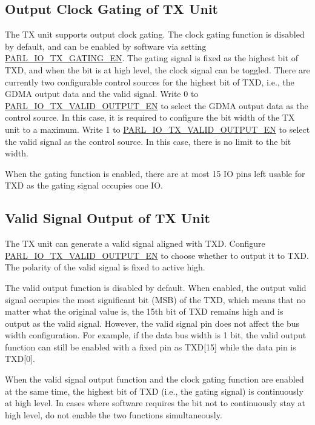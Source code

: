 \documentclass[main\_\_EN.tex]{subfiles}
\begin{document}
{
\subsection{Output Clock Gating of TX Unit}

The TX unit supports output clock gating. The clock gating function is disabled by default, and can be enabled by software via setting \hyperref[fielddesc:PARLIOTXGATINGEN]{PARL\_IO\_TX\_GATING\_EN}. The gating signal is fixed as the highest bit of TXD, and when the bit is at high level, the clock signal can be toggled. There are currently two configurable control sources for the highest bit of TXD, i.e., the GDMA output data and the valid signal. Write 0 to \hyperref[fielddesc:PARLIOTXVALIDOUTPUTEN]{PARL\_IO\_TX\_VALID\_OUTPUT\_EN} to select the GDMA output data as the control source. In this case, it is required to configure the bit width of the TX unit to a maximum. Write 1 to \hyperref[fielddesc:PARLIOTXVALIDOUTPUTEN]{PARL\_IO\_TX\_VALID\_OUTPUT\_EN} to select the valid signal as the control source. In this case, there is no limit to the bit width.

When the gating function is enabled, there are at most 15 IO pins left usable for TXD as the gating signal occupies one IO.

\subsection{Valid Signal Output of TX Unit }

The TX unit can generate a valid signal aligned with TXD. Configure \hyperref[fielddesc:PARLIOTXVALIDOUTPUTEN]{PARL\_IO\_TX\_VALID\_OUTPUT\_EN} to choose whether to output it to TXD. The polarity of the valid signal is fixed to active high.

The valid output function is disabled by default. When enabled, the output valid signal occupies the most significant bit (MSB) of the TXD, which means that no matter what the original value is, the 15th bit of TXD remains high and is output as the valid signal. However, the valid signal pin does not affect the bus width configuration. For example, if the data bus width is 1 bit, the valid output function can still be enabled with a fixed pin as TXD[15] while the data pin is TXD[0].


\begin{tiplisting}
When the valid signal output function and the clock gating function are enabled at the same time, the highest bit of TXD (i.e., the gating signal) is continuously at high level. In cases where software requires the bit not to continuously stay at high level, do not enable the two functions simultaneously.
\end{tiplisting}
}
\end{document}
